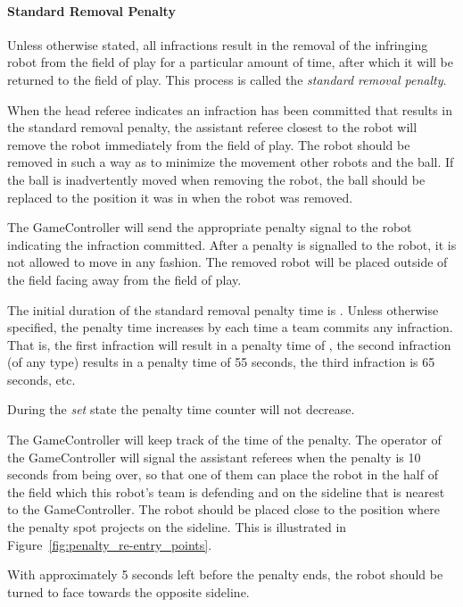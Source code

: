\paragraph{Standard Removal Penalty}
\label{sec:removal_penalty}

Unless otherwise stated, all infractions result in the removal of the infringing robot from the field of play for a particular amount of time, after which it will be returned to the field of play. This process is called the \textit{standard removal penalty}.

When the head referee indicates an infraction has been committed that results in the standard removal penalty, the assistant referee closest to the robot will remove the robot immediately from the field of play. The robot should be removed in such a way as to minimize the movement other robots and the ball. If the ball is inadvertently moved when removing the robot, the ball should be replaced to the position it was in when the robot was removed.

The GameController will send the appropriate penalty signal to the robot indicating the infraction committed. After a penalty is signalled to the robot, it is not allowed to move in any fashion. The removed robot will be placed outside of the field facing away from the field of play.

The initial duration of the standard removal penalty time is \StandardPenaltyTime.
Unless otherwise specified, the penalty time increases by \StandardPenaltyIncrease each time a team commits any infraction.
That is, the first infraction will result in a penalty time of \StandardPenaltyTime, the second infraction (of any type) results in a penalty time of 55 seconds, the third infraction is 65 seconds, etc.

During the \emph{set} state the penalty time counter will not decrease.

The GameController will keep track of the time of the penalty. The operator of the GameController will signal the assistant referees when the penalty is 10 seconds from being over, so that one of them can place the robot in the half of the field which this robot's team is defending and on the sideline that is nearest to the GameController. The robot should be placed close to the position where the penalty spot projects on the sideline. This is illustrated in Figure~\ref{fig:penalty_re-entry_points}.

With approximately 5 seconds left before the penalty ends, the robot should be turned to face towards the opposite sideline.

